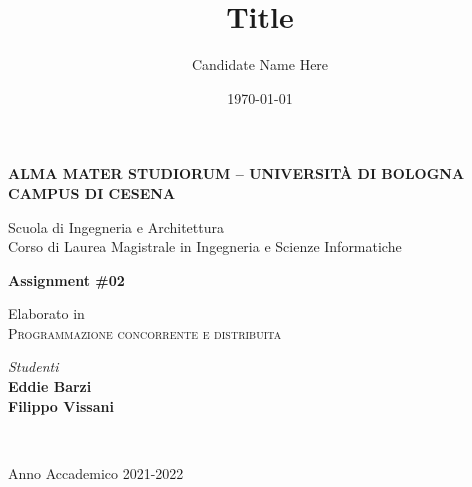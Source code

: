 \title{Title}
\author{Candidate Name Here}
\date{\today}

\begin{titlepage}
	\begin{center}
		
		\large
		\textbf{ALMA MATER STUDIORUM -- UNIVERSITÀ DI BOLOGNA \\ CAMPUS DI CESENA}
		\\
		\noindent\hrulefill
		\vspace{0.4cm}
		
		\Large
		Scuola di Ingegneria e Architettura \\
		Corso di Laurea Magistrale in Ingegneria e Scienze Informatiche
		
		\Huge
		\vspace{4cm}
		\textbf{Assignment \#02}
		
		\large
		\vspace{1cm}
		Elaborato in 
		\\
		\textsc{Programmazione concorrente e distribuita}
		
		\vspace{5.5cm}
		\begin{minipage}[t]{0.64\textwidth}
			\begin{flushleft}
			\end{flushleft}
		\end{minipage}
		\begin{minipage}[t]{0.34\textwidth}
			\begin{flushright}
				\textit{Studenti} 
				\\ 
				\textbf{Eddie Barzi}
				\\ 
				\textbf{Filippo Vissani}
			\end{flushright}
		\end{minipage}\\
		
		\vfill
		\noindent\hrulefill
		\vspace{0.3cm}
		\Large

		Anno Accademico 2021-2022
	\end{center}
\end{titlepage}
\restoregeometry
